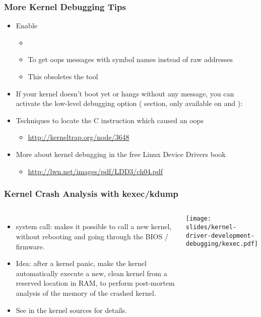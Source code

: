 \begin{frame}
  \frametitle{More Kernel Debugging Tips}
  \begin{itemize}
  \item Enable 
    \begin{itemize}
    \item {}
    \item To get oops messages with symbol names instead of raw addresses
    \item This obsoletes the  tool
    \end{itemize}
  \item If your kernel doesn't boot yet or hangs without any message,
    you can activate the low-level debugging option
    ( section, only available on  and
    ): 
  \item Techniques to locate the C instruction which caused an oops
    \begin{itemize}
    \item \url{http://kerneltrap.org/node/3648}
    \end{itemize}
  \item More about kernel debugging in the free Linux Device Drivers book
    \begin{itemize}
    \item \url{http://lwn.net/images/pdf/LDD3/ch04.pdf}
    \end{itemize}
  \end{itemize}
\end{frame}

\begin{frame}
  \frametitle{Kernel Crash Analysis with kexec/kdump}
  \begin{columns}
    \begin{itemize}
    \item {} system call: makes it possible to call a new
      kernel, without rebooting and going through the BIOS / firmware.
    \item Idea: after a kernel panic, make the kernel automatically
      execute a new, clean kernel from a reserved location in RAM, to
      perform post-mortem analysis of the memory of the crashed
      kernel.
    \item See  in the kernel
      sources for details.
    \end{itemize}
    \texttt{[image: slides/kernel-driver-development-debugging/kexec.pdf]}
  \end{columns}
\end{frame}

